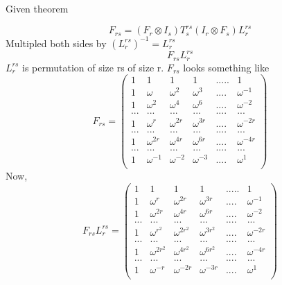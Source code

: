 \documentclass{article}
\begin{document}
	Given theorem
	
	\begin{equation}
		F_{rs} = (F_r \otimes I_s)T^{rs}_s(I_r \otimes F_s) L^{rs}_r
	\end{equation}
	Multipled both sides by $(L^{rs}_r)^{-1}=L^{rs}_r$
	\begin{equation}
		F_{rs}L^{rs}_r
	\end{equation}
	$L^{rs}_r$ is permutation of size rs of size r. $F_{rs}$ looks something like
	\begin{equation}
		F_{rs}=\begin{pmatrix}
			1 & 1 & 1 & 1 & ..... & 1 \\
			1 & \omega & \omega^2 & \omega^3 & .... & \omega^{-1} \\
			1 & \omega^2 & \omega^4 & \omega^6 & .... & \omega^{-2} \\
			...& ...&...&...&....&...\\
			1 & \omega^r & \omega^{2r} & \omega^{3r} & .... & \omega^{-2r}\\
			...& ...&...&...&....&...\\
			1 & \omega^{2r} & \omega^{4r} & \omega^{6r} & .... & \omega^{-4r}\\
			...& ...&...&...&....&...\\
			1 & \omega^{-1} & \omega^{-2} & \omega^{-3} & .... & \omega^1\\
		\end{pmatrix}
	\end{equation}
	Now,
	\begin{equation}
		F_{rs}L^{rs}_r=
		\begin{pmatrix}
			1 & 1 & 1 & 1 & ..... & 1 \\
			1 & \omega^{r} & \omega^{2r} & \omega^{3r} & .... & \omega^{-1} \\
			1 & \omega^{2r} & \omega^{4r} & \omega^{6r} & .... & \omega^{-2} \\
			...& ...&...&...&....&...\\
			1 & \omega^{r^2} & \omega^{2r^2} & \omega^{3r^2} & .... & \omega^{-2r}\\
			...& ...&...&...&....&...\\
			1 & \omega^{2r^2} & \omega^{4r^2} & \omega^{6r^2} & .... & \omega^{-4r}\\
			...& ...&...&...&....&...\\
			1 & \omega^{-r} & \omega^{-2r} & \omega^{-3r} & .... & \omega^1\\
		\end{pmatrix}
	\end{equation}
\end{document}
